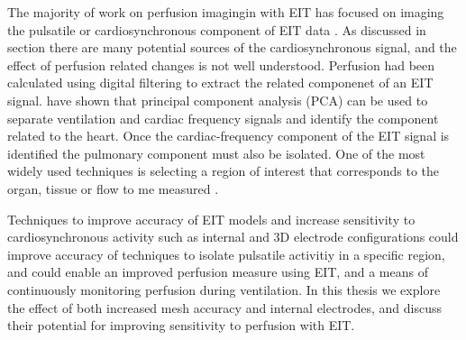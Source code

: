 The majority of work on perfusion imagingin with EIT has focused on imaging the pulsatile or 
cardiosynchronous component of EIT data \parencite{nguyen_review_2012}. 
As discussed in section  there are many potential sources of 
the cardiosynchronous signal, and the effect of perfusion related changes is not well understood. 
Perfusion had been calculated using digital filtering to extract the related componenet
of an EIT signal. 
 have shown that principal component analysis (PCA) 
can be used to separate ventilation and cardiac frequency signals and identify the component 
related to the heart. Once the cardiac-frequency component of the 
EIT signal is identified the pulmonary component must also be isolated. 
One of the most widely used techniques 
is selecting a region of interest that corresponds 
to the organ, tissue or flow to me measured
\parencite{braun_accuracy_2018,sola_non-invasive_2011}.

Techniques to improve accuracy of EIT models and increase sensitivity 
to cardiosynchronous activity 
such as internal and 3D electrode configurations could improve 
accuracy of techniques to isolate pulsatile
activitiy in a specific region, and could enable an 
improved perfusion measure 
using EIT, and a means of continuously monitoring perfusion during ventilation.
In this thesis we explore the effect of both increased mesh accuracy and internal electrodes,
and discuss their potential for improving sensitivity to perfusion with EIT.
























